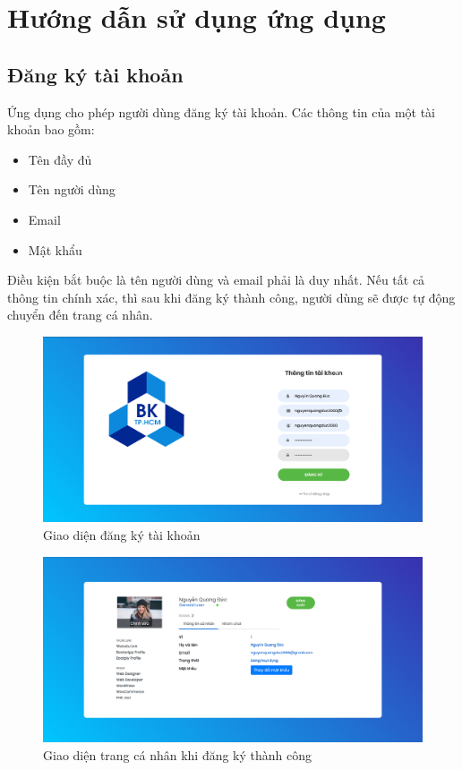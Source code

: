 \documentclass[a4paper]{article}
\begin{document}
\section{Hướng dẫn sử dụng ứng dụng}
	\subsection{Đăng ký tài khoản}
	Ứng dụng cho phép người dùng đăng ký tài khoản. Các thông tin của một tài khoản bao gồm:\linebreak
	\begin{itemize}
		\item Tên đầy đủ
		\item Tên người dùng
		\item Email
		\item Mật khẩu
	\end{itemize}
	Điều kiện bắt buộc là tên người dùng và email phải là duy nhất.\linebreak
	Nếu tất cả thông tin chính xác, thì sau khi đăng ký thành công, người dùng sẽ được tự động chuyển đến trang cá nhân.
	
	\begin{figure}[H]
		\centering
		\includegraphics[scale=0.36]{create_user.png}
		\caption{Giao diện đăng ký tài khoản}
		\label{F:create_user}
	\end{figure}
	
	\begin{figure}[H]
		\centering
		\includegraphics[scale=0.36]{profile_manager.png}
		\caption{Giao diện trang cá nhân khi đăng ký thành công}
		\label{F:profile_manager_register}
	\end{figure}
	
\end{document}
